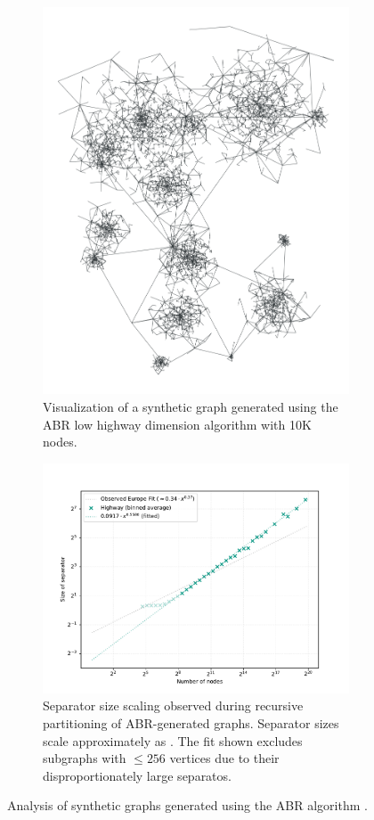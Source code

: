 \begin{figure}[tbhp]
    \centering
    \begin{subfigure}{0.35\linewidth}
        \centering
        \includegraphics[height=\linewidth, angle=90]{graphics/highway.png}
        \caption{Visualization of a synthetic graph generated using the ABR low highway dimension algorithm with 10K nodes.}
        \label{fig:abr_graph_viz}
    \end{subfigure}
    \hfill
    \begin{subfigure}{0.55\linewidth}
        \centering
        \includegraphics[width=\linewidth]{graphics/sep_highway.pdf}
        \caption{Separator size scaling observed during recursive partitioning of ABR-generated graphs. Separator sizes scale approximately as . The fit shown excludes subgraphs with \( \le 256 \) vertices due to their disproportionately large separatos.}
        \label{fig:abr_graph_sep_plot}
    \end{subfigure}
    \caption{Analysis of synthetic graphs generated using the ABR algorithm \cite{abraham_highway_2010}.}
    \label{fig:abr_graph_separators}
\end{figure}

